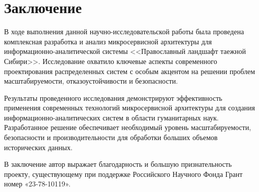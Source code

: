 \chapter*{Заключение}                       %


В ходе выполнения данной научно-исследовательской работы была проведена комплексная разработка и анализ микросервисной архитектуры для информационно-аналитической системы <<Православный ландшафт таежной Сибири>>. Исследование охватило ключевые аспекты современного проектирования распределенных систем с особым акцентом на решении проблем масштабируемости, отказоустойчивости и безопасности.


Результаты проведенного исследования демонстрируют эффективность применения современных технологий микросервисной архитектуры для создания информационно-аналитических систем в области гуманитарных наук. Разработанное решение обеспечивает необходимый уровень масштабируемости, безопасности и производительности для обработки больших объемов исторических данных.

В заключение автор выражает благодарность и большую признательность проекту, существующему при поддержке Российского Научного
Фонда Грант номер «23-78-10119».
